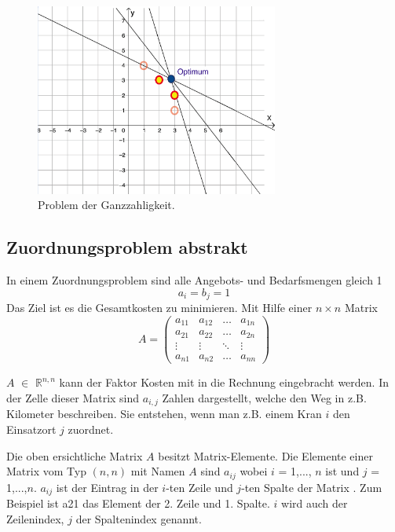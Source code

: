 \begin{figure}
\centering
\includegraphics[width=8cm]{papers/munkres/figures/ganzzahlige_punkte}
\caption{Problem der Ganzzahligkeit.}
\label{munkres:Vr2}
\end{figure}


\subsection{Zuordnungsproblem abstrakt
\label{munkres:subsection:bonorum}}

In einem Zuordnungsproblem sind alle Angebots- und Bedarfsmengen gleich 1 
\begin{equation}
a_{i}=b_{j}=1
\end{equation}
Das Ziel ist es die Gesamtkosten zu minimieren. Mit Hilfe einer $n\times n$ Matrix 
\[
A
=
\begin{pmatrix}
a_{11}&a_{12}&\dots &a_{1n}\\
a_{21}&a_{22}&\dots &a_{2n}\\
\vdots&\vdots&\ddots&\vdots\\
a_{n1}&a_{n2}&\dots &a_{nn}
\end{pmatrix}
\]
    
$A$ $\mathbb{\in}$ $\mathbb{R}^{n,n}$ kann der Faktor Kosten mit in die Rechnung eingebracht werden.
In der Zelle dieser Matrix sind $a_{i,j}$ Zahlen dargestellt, welche den Weg in z.B. Kilometer beschreiben.
Sie entstehen, wenn man z.B. einem Kran $i$ den Einsatzort $j$ zuordnet.

Die oben ersichtliche Matrix $A$ besitzt Matrix-Elemente. Die Elemente einer Matrix vom Typ $(n,n)$ mit Namen $A$ sind $a_{ij}$ wobei $i$ = 1,..., $n$ ist und $j$ = 1,...,$n$. $a_{ij}$ ist der Eintrag in der $i$-ten Zeile und $j$-ten Spalte der Matrix . Zum Beispiel ist a21 das Element der 2. Zeile und 1. Spalte. $i$ wird auch der Zeilenindex, $j$ der Spaltenindex genannt.

